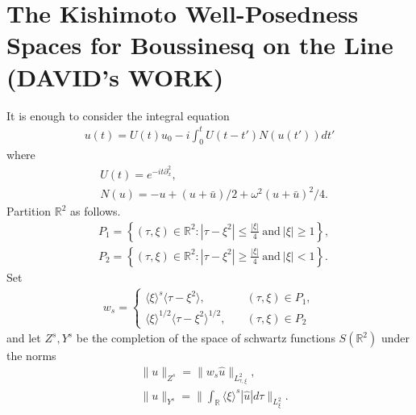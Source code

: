\documentclass{amsart}
\newcommand{\rr}{\mathbb{R}}
\newcommand{\wh}{\widehat}
\newcommand{\p}{\partial}
\begin{document}
\section{The Kishimoto Well-Posedness Spaces for Boussinesq on the Line (DAVID's WORK)}
It is enough to consider the integral equation
%
%
\begin{equation}
  \label{nls-type-int}
\begin{split}
  u(t) = U(t) u_{0} -i \int_{0}^{t} U(t -t')N(u(t')) dt'
\end{split}
\end{equation}
%
%
where 
%
%
\begin{equation*}
\begin{split}
  & U(t) = e^{-it \p_x^{2}},
  \\
  & N(u) = -u + (u + \bar{u})/2 + \omega^{2}(u + \bar{u})^{2}/4.
\end{split}
\end{equation*}
%
%
Partition $\rr^{2}$ as follows.
%
%
\begin{equation*}
\begin{split}
  & P_{1} = \left\{ (\tau, \xi) \in \rr^{2}: | \tau - \xi^{2} | \le \frac{| \xi
  |}{4} \ \text{and} \ | \xi | \ge 1 \right\},
  \\
  & P_{2} = \left\{ (\tau, \xi) \in \rr^{2}: | \tau - \xi^{2} | \ge \frac{| \xi
  |}{4} \ \text{and} \ | \xi | < 1 \right\}.
\end{split}
\end{equation*}
%
%
Set
%
%
\begin{equation*}
\begin{split}
  w_{s} = 
  \begin{cases}
    \langle \xi \rangle ^{s} \langle \tau - \xi^{2} \rangle , \quad & (\tau,
    \xi) \in P_{1},
    \\
    \langle \xi \rangle ^{1/2} \langle \tau - \xi^{2} \rangle^{1/2}, \quad
    & (\tau, \xi) \in P_{2}
  \end{cases}
\end{split}
\end{equation*}
%
%
and let $Z^{s}, Y^{s}$ be the completion of the space of schwartz functions
$S(\rr^{2})$ under the norms
%
%
\begin{equation*}
\begin{split}
  & \| u \|_{Z^{s}} = \| w_{s} \wh{u} \|_{L^{2}_{\tau, \xi}},
  \\
  & \| u \|_{Y^{s}} = \| \int_{\rr} \langle \xi \rangle^{s} | \wh{u} | d \tau
  \|_{L^{2}_{\xi}}.
\end{split}
\end{equation*}
\end{document}
